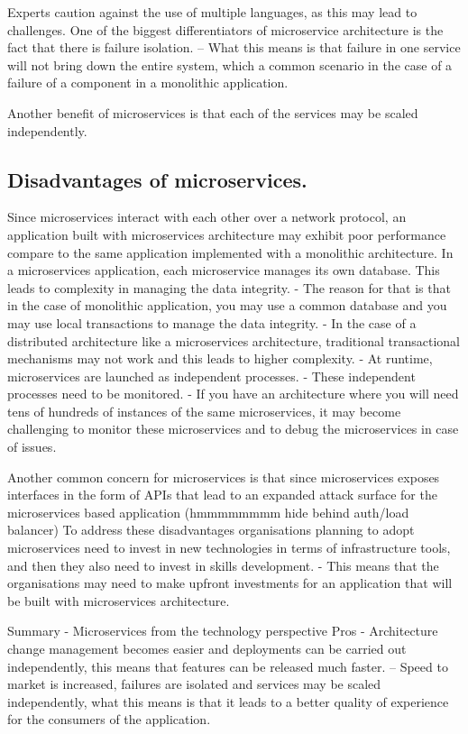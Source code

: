 \documentclass[a4paper, 11pt]{book}
\begin{document}
    Experts caution against the use of multiple languages, as this may lead to challenges.
    One of the biggest differentiators of microservice architecture is the fact that there is failure isolation.
    -- What this means is that failure in one service will not bring down the entire system, which a common scenario in the case of a failure of a component in a monolithic application.

    Another benefit of microservices is that each of the services may be scaled independently.

    \subsection{Disadvantages of microservices.}
    Since microservices interact with each other over a network protocol, an application built with microservices architecture may exhibit poor performance compare to the same application implemented with a monolithic architecture.
    In a microservices application, each microservice manages its own database.
    This leads to complexity in managing the data integrity.
    - The reason for that is that in the case of monolithic application, you may use a common database and you may use local transactions to manage the data integrity.
    - In the case of a distributed architecture like a microservices architecture, traditional transactional mechanisms may not work and this leads to higher complexity.
    - At runtime, microservices are launched as independent processes.
    - These independent processes need to be monitored.
    - If you have an architecture where you will need tens of hundreds of instances of the same microservices, it may become challenging to monitor these microservices and to debug the microservices in case of issues.

    Another common concern for microservices is that since microservices exposes interfaces in the form of APIs that lead to an expanded attack surface for the microservices based application (hmmmmmmmm hide behind auth/load balancer)
    To address these disadvantages organisations planning to adopt microservices need to invest in new technologies in terms of infrastructure tools, and then they also need to invest in skills development.
    - This means that the organisations may need to make upfront investments for an application that will be built with microservices architecture.


    Summary - Microservices from the technology perspective
    Pros
    - Architecture change management becomes easier and deployments can be carried out independently, this means that features can be released much faster.
    -- Speed to market is increased, failures are isolated and services may be scaled independently, what this means is that it leads to a better quality of experience for the consumers of the application.
\end{document}
